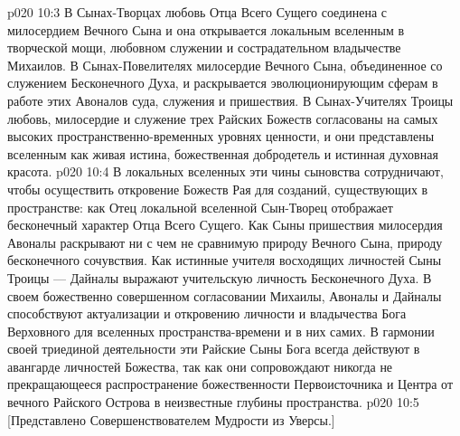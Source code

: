 \vs p020 10:3 В Сынах\hyp{}Творцах любовь Отца Всего Сущего соединена с милосердием Вечного Сына и она открывается локальным вселенным в творческой мощи, любовном служении и сострадательном владычестве Михаилов. В Сынах\hyp{}Повелителях милосердие Вечного Сына, объединенное со служением Бесконечного Духа, и раскрывается эволюционирующим сферам в работе этих Авоналов суда, служения и пришествия. В Сынах\hyp{}Учителях Троицы любовь, милосердие и служение трех Райских Божеств согласованы на самых высоких пространственно\hyp{}временных уровнях ценности, и они представлены вселенным как живая истина, божественная добродетель и истинная духовная красота.
\vs p020 10:4 В локальных вселенных эти чины сыновства сотрудничают, чтобы осуществить откровение Божеств Рая для созданий, существующих в пространстве: как Отец локальной вселенной Сын\hyp{}Творец отображает бесконечный характер Отца Всего Сущего. Как Сыны пришествия милосердия Авоналы раскрывают ни с чем не сравнимую природу Вечного Сына, природу бесконечного сочувствия. Как истинные учителя восходящих личностей Сыны Троицы --- Дайналы выражают учительскую личность Бесконечного Духа. В своем божественно совершенном согласовании Михаилы, Авоналы и Дайналы способствуют актуализации и откровению личности и владычества Бога Верховного для вселенных пространства\hyp{}времени и в них самих. В гармонии своей триединой деятельности эти Райские Сыны Бога всегда действуют в авангарде личностей Божества, так как они сопровождают никогда не прекращающееся распространение божественности Первоисточника и Центра от вечного Райского Острова в неизвестные глубины пространства.
\vsetoff
\vs p020 10:5 [Представлено Совершенствователем Мудрости из Уверсы.]
